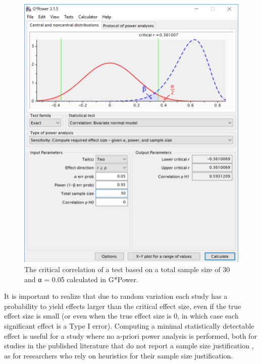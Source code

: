 \documentclass[
  oneside]{krantz}
\begin{document}
\begin{figure}

{\centering \includegraphics[width=1\linewidth]{images/gpowcrit2} 

}

\caption{The critical correlation of a test based on a total sample size of 30 and α = 0.05 calculated in G*Power.}\label{fig:gcrit2}
\end{figure}

It is important to realize that due to random variation each study has a probability to yield effects larger than the critical effect size, even if the true effect size is small (or even when the true effect size is 0, in which case each significant effect is a Type I error). Computing a minimal statistically detectable effect is useful for a study where no a-priori power analysis is performed, both for studies in the published literature that do not report a sample size justification \citep{lakens_equivalence_2018}, as for researchers who rely on heuristics for their sample size justification.
\end{document}

